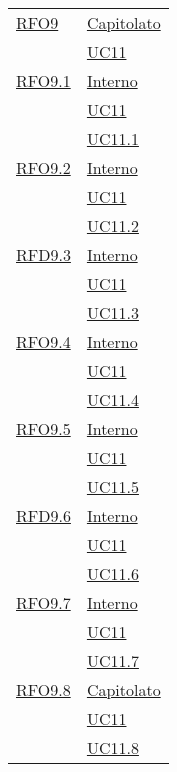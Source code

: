\begin{longtable}{|>{\centering}m{5cm}|m{5cm}<{\centering}|}
  \hyperlink{RFO9}{RFO9} 
  & \hyperlink{Capitolato}{Capitolato}\\
 & \hyperref[UC11]{UC11}\\\hline
 
   \hyperlink{RFO9.1}{RFO9.1} 
   & \hyperlink{Interno}{Interno}\\
 & \hyperref[UC11]{UC11}\\
  & \hyperref[UC11.1]{UC11.1}\\\hline
  
    \hyperlink{RFO9.2}{RFO9.2} 
    & \hyperlink{Interno}{Interno}\\
  & \hyperref[UC11]{UC11}\\
  & \hyperref[UC11.2]{UC11.2}\\\hline
  
     \hyperlink{RFD9.3}{RFD9.3} 
     & \hyperlink{Interno}{Interno}\\
  & \hyperref[UC11]{UC11}\\
  & \hyperref[UC11.3]{UC11.3}\\\hline
  
      \hyperlink{RFO9.4}{RFO9.4} 
      & \hyperlink{Interno}{Interno}\\
  & \hyperref[UC11]{UC11}\\
  & \hyperref[UC11.4]{UC11.4}\\\hline
  
      \hyperlink{RFO9.5}{RFO9.5} 
      & \hyperlink{Interno}{Interno}\\
  & \hyperref[UC11]{UC11}\\
  & \hyperref[UC11.5]{UC11.5}\\\hline
  
      \hyperlink{RFD9.6}{RFD9.6} 
      & \hyperlink{Interno}{Interno}\\
  & \hyperref[UC11]{UC11}\\
  & \hyperref[UC11.6]{UC11.6}\\\hline
  
    \hyperlink{RFO9.7}{RFO9.7} 
    & \hyperlink{Interno}{Interno}\\
  & \hyperref[UC11]{UC11}\\
  & \hyperref[UC11.7]{UC11.7}\\\hline

  \hyperlink{RFO9.8}{RFO9.8} 
  & \hyperlink{Capitolato}{Capitolato}\\
& \hyperref[UC11]{UC11}\\
& \hyperref[UC11.8]{UC11.8}\\\hline


\end{longtable}
